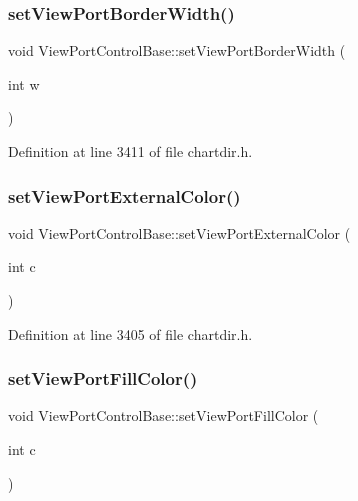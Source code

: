 \subsubsection{\texorpdfstring{set\+View\+Port\+Border\+Width()}{setViewPortBorderWidth()}}
{\footnotesize\ttfamily void View\+Port\+Control\+Base\+::set\+View\+Port\+Border\+Width (\begin{DoxyParamCaption}\item[{int}]{w }\end{DoxyParamCaption})\hspace{0.3cm}{\ttfamily [inline]}}



Definition at line 3411 of file chartdir.\+h.

\mbox{\label{class_view_port_control_base_a3d00840e391a598f1eff6eb62208cbfd}} 
\subsubsection{\texorpdfstring{set\+View\+Port\+External\+Color()}{setViewPortExternalColor()}}
{\footnotesize\ttfamily void View\+Port\+Control\+Base\+::set\+View\+Port\+External\+Color (\begin{DoxyParamCaption}\item[{int}]{c }\end{DoxyParamCaption})\hspace{0.3cm}{\ttfamily [inline]}}



Definition at line 3405 of file chartdir.\+h.

\mbox{\label{class_view_port_control_base_a4d0c34e2b62bc5d22259ee4db97a1a37}} 
\subsubsection{\texorpdfstring{set\+View\+Port\+Fill\+Color()}{setViewPortFillColor()}}
{\footnotesize\ttfamily void View\+Port\+Control\+Base\+::set\+View\+Port\+Fill\+Color (\begin{DoxyParamCaption}\item[{int}]{c }\end{DoxyParamCaption})\hspace{0.3cm}{\ttfamily [inline]}}



